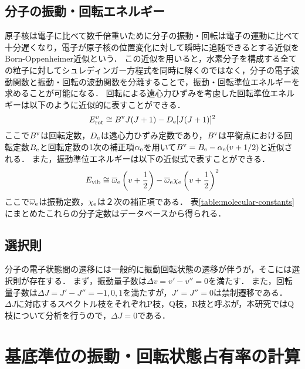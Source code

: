 \subsection{分子の振動・回転エネルギー}
原子核は電子に比べて数千倍重いために分子の振動・回転は電子の運動に比べて十分遅くなり，電子が原子核の位置変化に対して瞬時に追随できるとする近似をBorn-Oppenheimer近似という\cite{bunsibunko-no-kiso}．
この近似を用いると，水素分子を構成する全ての粒子に対してシュレディンガー方程式を同時に解くのではなく，分子の電子波動関数と振動・回転の波動関数を分離することで，振動・回転準位エネルギーを求めることが可能になる．
回転による遠心力ひずみを考慮した回転準位エネルギーは以下のように近似的に表すことができる\cite{bunsibunko-no-kiso}．
\begin{equation}
    E^v_{\rm rot} \cong B^{\rm v} J (J+1) - D_{\rm e} [J(J+1)]^2
\end{equation}
ここで$B^{\rm v}$は回転定数，$D_{\rm e}$は遠心力ひずみ定数であり，$B^{\rm v}$は平衡点における回転定数$B_{\rm e}$と回転定数の1次の補正項$\alpha_{\rm e}$を用いて$B^{\rm v}=B_{\rm e} - \alpha_{\rm e} (v + 1/2)$と近似される\cite{bunsibunko-no-kiso}．
また，振動準位エネルギーは以下の近似式で表すことができる\cite{bunsibunko-no-kiso}．
\begin{equation}
    E_{\rm vib} \cong \overline{\omega}_{\rm e} \left(v + \frac{1}{2} \right) - \overline{\omega}_{\rm e} \chi_{\rm e} \left(v + \frac{1}{2} \right)^2
\end{equation}
ここで$\overline{\omega}_{\rm e}$は振動定数，$\chi_{\rm e}$は２次の補正項である．
表\ref{table:molecular-constants}にまとめたこれらの分子定数はデータベースから得られる\cite{nist}．

\subsection{選択則}
分子の電子状態間の遷移には一般的に振動回転状態の遷移が伴うが，そこには選択則が存在する\cite{bunsibunko-no-kiso}．
まず，振動量子数は$\Delta v = v'-v'' = 0$を満たす．
また，回転量子数は$\Delta J = J' - J'' = -1,0,1$を満たすが，$J'=J''=0$は禁制遷移である．
$\Delta J$に対応するスペクトル枝をそれぞれP枝，Q枝，R枝と呼ぶが，本研究ではQ枝について分析を行うので，$\Delta J = 0$である．

\section{基底準位の振動・回転状態占有率の計算}
